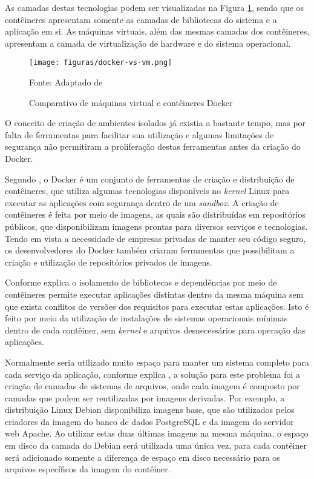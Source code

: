 As camadas destas tecnologias podem ser visualizadas na Figura
\ref{fig:docker-vs-vm}, sendo que os contêineres apresentam somente as camadas
de bibliotecas do sistema e a aplicação em si. As máquinas virtuais, além das
mesmas camadas dos contêineres, apresentam a camada de virtualização de
hardware e do sistema operacional.

\begin{figure}[H]
	\centering
	\caption{Comparativo de máquinas virtual e contêineres Docker}
	\texttt{[image: figuras/docker-vs-vm.png]}

	\label{fig:docker-vs-vm}
	\footnotesize Fonte: Adaptado de 
\end{figure}

O conceito de criação de ambientes isolados já existia a bastante tempo, mas
por falta de ferramentas para facilitar sua utilização e algumas limitações
de segurança não permitiram a proliferação destas ferramentas antes da criação
do Docker.

Segundo , o Docker é um conjunto de ferramentas de
criação e distribuição de contêineres, que utiliza algumas tecnologias
disponíveis no \emph{kernel} Linux para executar as aplicações com segurança
dentro de um \emph{sandbox}. A criação de contêineres é feita por meio de
imagens, as quais são distribuídas em repositórios públicos, que
disponibilizam imagens prontas para diversos serviços e tecnologias. Tendo
em vista a necessidade de empresas privadas de manter seu código seguro,
os desenvolvedores do Docker também criaram ferramentas que possibilitam a
criação e utilização de repositórios privados de imagens.

Conforme explica  o isolamento de bibliotecas e
dependências por meio de contêineres permite executar aplicações distintas
dentro da mesma máquina sem que exista conflitos de versões dos requisitos
para executar estas aplicações. Isto é feito por meio da utilização de
instalações de sistemas operacionais mínimas dentro de cada contêiner, sem
\emph{kernel} e arquivos desnecessários para operação das aplicações.

Normalmente seria utilizado muito espaço para manter um sistema completo para
cada serviço da aplicação, conforme explica , a
solução para este problema foi a criação de camadas de sistemas de arquivos,
onde cada imagem é composto por camadas que podem ser reutilizadas por imagens
derivadas. Por exemplo, a distribuição Linux Debian disponibiliza imagens
base, que são utilizados pelos criadores da imagem do banco de dados
PostgreSQL e da imagem do servidor web Apache. Ao utilizar estas duas últimas
imagens na mesma máquina, o espaço em disco da camada do Debian será utilizada
uma única vez, para cada contêiner será adicionado somente a diferença de
espaço em disco necessário para os arquivos específicos da imagem do contêiner.

